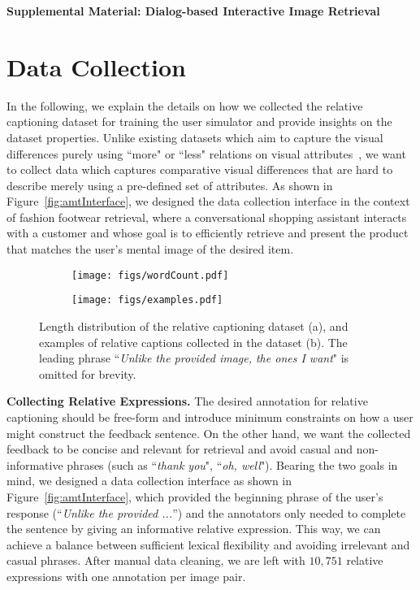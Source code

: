 \clearpage 
\newpage
\begin{center}
{\bf {\Large Supplemental Material: Dialog-based Interactive Image Retrieval \\} }
\end{center}
\appendix
\section{Data Collection}
\label{sec:app_data}

In the following, we explain the details on how we collected the relative 
captioning dataset for training the user simulator and provide insights 
on the dataset properties. Unlike existing datasets which aim to capture 
the visual differences purely using ``more" or ``less" relations on visual attributes~\cite{kovashka2012}, we want to collect data which 
captures comparative visual differences that are 
hard to describe merely using a pre-defined set of attributes. 
As shown in Figure~\ref{fig:amtInterface}, we designed the data collection 
interface in the context of fashion footwear retrieval, where 
a conversational shopping assistant interacts with a customer and whose goal
is to efficiently retrieve and present the product that matches 
the user's mental image of the desired item. 

\begin{figure*}[h]
\centering
	\begin{subfigure}[t]{0.4\textwidth}
        \centering
        \texttt{[image: figs/wordCount.pdf]}
        \caption{}
    \end{subfigure}
    \begin{subfigure}[t]{0.55\textwidth}
        \centering
        \texttt{[image: figs/examples.pdf]}
        \caption{}
    \end{subfigure}%
    \caption{Length distribution of the relative captioning dataset (a),
    and examples of relative captions collected in the dataset (b). 
    The leading phrase ``\emph{Unlike the provided image, the ones I want}" 
    is omitted for brevity.}
    \label{fig:relativeExample}
\end{figure*}
  
\textbf{Collecting Relative Expressions.} 
The desired annotation for relative captioning should be free-form and
introduce minimum constraints on how a user might construct the feedback
sentence. On the other hand, we want the collected feedback to be concise and 
relevant for retrieval and avoid casual and non-informative 
phrases (such as ``\emph{thank you}", ``\emph{oh, well}"). 
Bearing the two goals in mind, we designed a data collection interface as
shown in Figure~\ref{fig:amtInterface}, which provided the beginning phrase 
of the user's response (``\emph{Unlike the provided ...}'') and the annotators only 
needed to complete the sentence by giving an informative relative expression. 
This way, we can achieve a balance between sufficient lexical flexibility and 
avoiding irrelevant and casual phrases. After manual data cleaning, we are left
with $10,751$ relative expressions with one annotation per image pair. 

